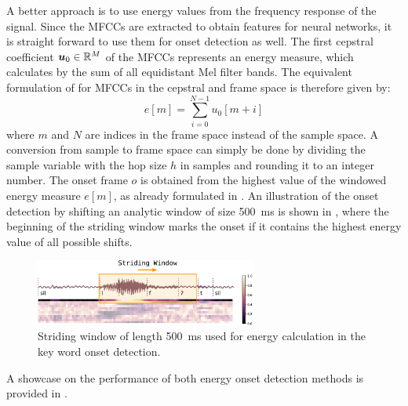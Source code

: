 A better approach is to use energy values from the frequency response of the signal.
Since the MFCCs are extracted to obtain features for neural networks, it is straight forward to use them for onset detection as well.
The first cepstral coefficient $\bm{u}_0 \in \mathbb{R}^M$ of the MFCCs represents an energy measure, which calculates by the sum of all equidistant Mel filter bands.
The equivalent formulation of  for MFCCs in the cepstral and frame space is therefore given by:
\begin{equation}
  e[m] = \sum_{i=0}^{N-1} u_0[m + i]
\end{equation}
where $m$ and $N$ are indices in the frame space instead of the sample space.
A conversion from sample to frame space can simply be done by dividing the sample variable with the hop size $h$ in samples and rounding it to an integer number.
The onset frame $o$ is obtained from the highest value of the windowed energy measure $e[m]$, as already formulated in .
An illustration of the onset detection by shifting an analytic window of size \SI{500}{\milli\second} is shown in , where
the beginning of the striding window marks the onset if it contains the highest energy value of all possible shifts.
\begin{figure}[!ht]
  \centering
    \includegraphics[width=0.65\textwidth]{./3_signal/figs/signal_onset_window.pdf}
  \caption{Striding window of length \SI{500}{\milli\second} used for energy calculation in the key word onset detection.}
  \label{fig:signal_onset_window}
\end{figure}
\FloatBarrier
\noindent
A showcase on the performance of both energy onset detection methods is provided in .
